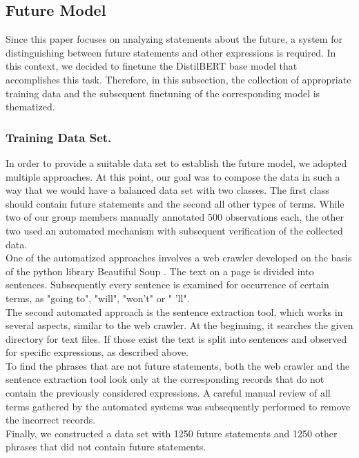 \subsection{Future Model}
\label{future-model}
Since this paper focuses on analyzing statements about the future, a system for distinguishing between future statements and other expressions is required.
In this context, we decided to finetune the DistilBERT \citep{Sanh2019DistilBERTAD} base model that accomplishes this task.
Therefore, in this subsection, the collection of appropriate training data and the subsequent finetuning of the corresponding model is thematized.

\subsubsection{Training Data Set.}
\label{training}
In order to provide a suitable data set to establish the future model, we adopted multiple approaches.
At this point, our goal was to compose the data in such a way that we would have a balanced data set with two classes.
The first class should contain future statements and the second all other types of terms.
While two of our group members manually annotated 500 observations each, the other two used an automated mechanism with subsequent verification of the collected data.
\\
One of the automatized approaches involves a web crawler developed on the basis of the python library Beautiful Soup \citep{Richardson2022}.
The text on a page is divided into sentences.
Subsequently every sentence is examined for occurrence of certain terms, as "going to", "will", "won't" or " 'll".
\\
The second automated approach is the sentence extraction tool, which works in several aspects, similar to the web crawler.
At the beginning, it searches the given directory for text files.
If those exist the text is split into sentences and observed for specific expressions, as described above.
\\
To find the phrases that are not future statements, both the web crawler and the sentence extraction tool look only at the corresponding records that do not contain the previously considered expressions.
A careful manual review of all terms gathered by the automated systems was subsequently performed to remove the incorrect records.
\\
Finally, we constructed a data set with 1250 future statements and 1250 other phrases that did not contain future statements.

